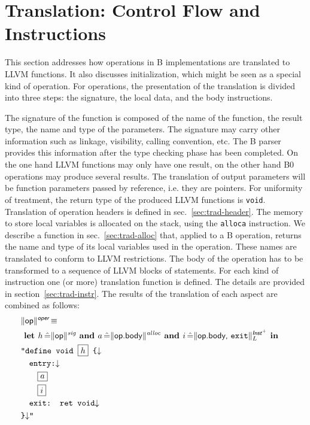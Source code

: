 \documentclass{article}
\newcommand{\trad}[2]{\ensuremath{\lVert \textsf{#1} \rVert^{\textit{#2}}}}
\newcommand{\nl}[0]{\ensuremath{\downarrow}}
\DeclareMathOperator{\isdef}{\equiv}
\newcommand{\llvm}[1]{\texttt{#1}}
\newcommand{\B}[1]{\textsf{#1}}
\newcommand{\ListOf}[1]{$\mbox{#1}^+$}
\newcommand{\LET}[0]{\textbf{ let }}
\DeclareMathOperator{\BE}{\hat{=}}
\newcommand{\IN}[0]{\textbf{ in }}
\newcommand{\AND}[0]{\textbf{ and }}
\newcommand{\PH}[1]{\framebox{$#1$}}
\begin{document}
\section{Translation: Control Flow and Instructions
\label{sec:control}}

This section addresses how operations in B implementations are translated to
LLVM functions. It also discusses initialization, which might be seen as a
special kind of operation. For operations, the presentation of the translation
is divided into three steps: the signature, the local data, and the body
instructions.

The signature of the function is composed of the name of the function, the
result type, the name and type of the parameters. The signature may carry other
information such as linkage, visibility, calling convention, etc. The B parser
provides this information after the type checking phase has been completed.  On
the one hand LLVM functions may only have one result, on the other hand B0
operations may produce several results. The translation of output parameters
will be function parameters passed by reference, i.e. they are pointers. For
uniformity of treatment, the return type of the produced LLVM functions is
\llvm{void}. Translation of operation headers is defined in
sec.~\ref{sec:trad-header}. The memory to store local variables is allocated on
the stack, using the \llvm{alloca} instruction. We describe a function in
sec.~\ref{sec:trad-alloc} that, applied to a B operation, returns the name and
type of its local variables used in the operation. These names are translated to
conform to LLVM restrictions. The body of the operation has to be transformed to
a sequence of LLVM blocks of statements. For each kind of instruction one (or
more) translation function is defined. The details are provided in
section~\ref{sec:trad-instr}.  The results of the translation of each aspect are
combined as follows:
\begin{align*}
\begin{split}
  \lefteqn{\trad{\B{op}}{\B{oper}} \isdef} \\
  & \LET h \BE \trad{\B{op}}{sig} \AND   a \BE \trad{\B{op.body}}{alloc} \AND i \BE \trad{\B{op.body}, \llvm{exit}}{\ListOf{\B{Inst}}}_L \IN  \\
  & \llvm{"define void \PH{h} \{\nl} \\
  & \quad \llvm{entry:\nl} \\
  & \quad \quad \PH{a} \\
  & \quad \quad \PH{i} \\
  & \quad \llvm{exit: ret void\nl} \\
  & \llvm{\}\nl"}
\end{split}
\end{align*}
\end{document}
